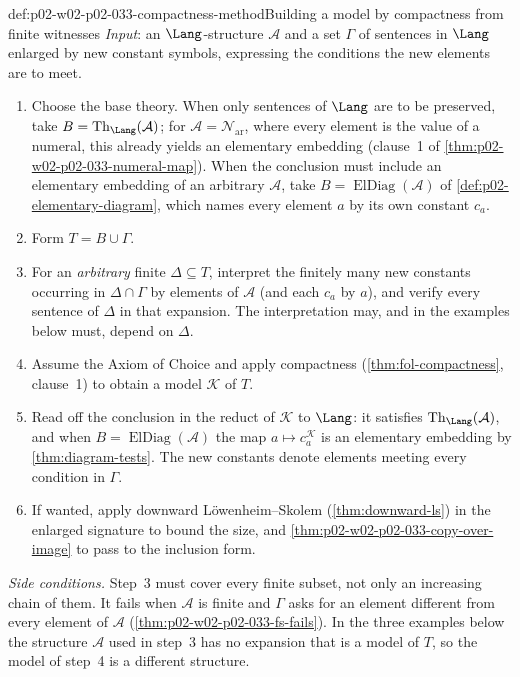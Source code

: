 \begin{hbmethod}{def:p02-w02-p02-033-compactness-method}{Building a model by compactness from finite witnesses}
\emph{Input}: an \(\Lang\)-structure \(\mathcal A\) and a set \(\Gamma\) of
sentences in \(\Lang\) enlarged by new constant symbols, expressing the
conditions the new elements are to meet.
\begin{enumerate}
  \item Choose the base theory.  When only sentences of \(\Lang\) are to be
        preserved, take \(B=\operatorname{Th}_{\Lang}(\mathcal A)\); for
        \(\mathcal A=\mathcal N_{\mathrm{ar}}\), where every element is the
        value of a numeral, this already yields an elementary embedding
        (clause~1 of \cref{thm:p02-w02-p02-033-numeral-map}).  When the
        conclusion must include an elementary embedding of an arbitrary
        \(\mathcal A\), take \(B=\operatorname{ElDiag}(\mathcal A)\) of
        \cref{def:p02-elementary-diagram}, which names every element \(a\) by
        its own constant \(c_a\).
  \item Form \(T=B\cup\Gamma\).
  \item For an \emph{arbitrary} finite \(\Delta\subseteq T\), interpret the
        finitely many new constants occurring in \(\Delta\cap\Gamma\) by
        elements of \(\mathcal A\) (and each \(c_a\) by \(a\)), and verify
        every sentence of \(\Delta\) in that expansion.  The interpretation
        may, and in the examples below must, depend on \(\Delta\).
  \item Assume the Axiom of Choice and apply compactness
        (\cref{thm:fol-compactness}, clause~1) to obtain a model
        \(\mathcal K\) of \(T\).
  \item Read off the conclusion in the reduct of \(\mathcal K\) to
        \(\Lang\): it satisfies \(\operatorname{Th}_{\Lang}(\mathcal A)\), and
        when \(B=\operatorname{ElDiag}(\mathcal A)\) the map
        \(a\mapsto c_a^{\mathcal K}\) is an elementary embedding by
        \cref{thm:diagram-tests}.  The new constants denote elements meeting
        every condition in \(\Gamma\).
  \item If wanted, apply downward L\"owenheim--Skolem
        (\cref{thm:downward-ls}) in the enlarged signature to bound the size,
        and \cref{thm:p02-w02-p02-033-copy-over-image} to pass to the
        inclusion form.
\end{enumerate}
\emph{Side conditions.}  Step~3 must cover every finite subset, not only an
increasing chain of them.  It fails when \(\mathcal A\) is finite and
\(\Gamma\) asks for an element different from every element of
\(\mathcal A\) (\cref{thm:p02-w02-p02-033-fs-fails}).  In the three examples
below the structure \(\mathcal A\) used in step~3 has no expansion that is a
model of \(T\), so the model of step~4 is a different structure.
\end{hbmethod}

